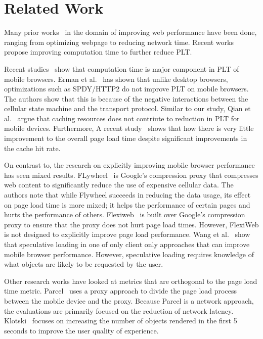 \section{Related Work}
\label{sec:related}

Many prior works~\cite{erman2013conext, quian2012mobisys,
sivakumar2014conext, mai2012hotpar, meyerovich2010www, zhu2013hpca}
in the domain of improving web performance have been
done, ranging from optimizing webpage to reducing network time.
Recent works~\cite{vesuna2016caching, agababov2015nsdi,
butkiewicz2015usenix} propose improving computation time to further
reduce PLT.

Recent studies~\cite{erman2013conext, quian2012mobisys,
vesuna2016caching} show that computation time is major component in
PLT of mobile browsers.  Erman et al.~\cite{erman2013conext} has shown
that unlike desktop browsers, optimizations such as SPDY/HTTP2 do not
improve PLT on mobile browsers. The authors show that this is because
of the negative interactions between the cellular state machine and
the transport protocol.  Similar to our study, Qian et
al.~\cite{quian2012mobisys} argue that caching resources does not
contriute to reduction in PLT for mobile devices. Furthermore, A
recent study~\cite{vesuna2016caching} shows that how there is very
little improvement to the overall page load time despite significant
improvements in the cache hit rate. 

On contrast to, the research on explicitly improving mobile browser
performance has seen mixed results.
FLywheel~\cite{agababov2015nsdi} is Google's compression proxy that compresses web content to significantly 
reduce the use of expensive cellular data. The authors note that while Flywheel succeeds in
reducing the data usage, its effect on page load time is more mixed; it helps
the performance of certain pages and hurts the performance of others.
Flexiweb~\cite{singh2015mobicom} is built over
Google's compression proxy to ensure that the proxy does not hurt page load times. However, FlexiWeb
is not designed to explicitly improve page load performance. Wang et
al.~\cite{wang2013demystifying} show that
speculative loading in one of only client only approaches that can improve mobile
browser performance. However, speculative loading requires knowledge of what objects are likely
to be requested by the user. 


Other research works have looked at metrics that are orthogonal to the
page load time metric. Parcel~\cite{sivakumar2014conext} uses a proxy
approach to divide the page load process between the mobile device and
the proxy. Because Parcel is a network approach, the evaluations are
primarily focused on the reduction of network latency.
Klotski~\cite{butkiewicz2015usenix} focuses on increasing the number
of objects rendered in the first 5 seconds to improve the user quality
of experience. 

